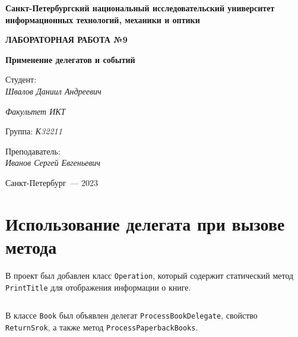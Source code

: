 \documentclass[a4paper,14pt]{extarticle}
\numberwithin{figure}{section}
\begin{document}
\begin{titlepage}
    \vspace{0pt plus2fill}
    \noindent

    \vspace{0pt plus6fill}
    \begin{center}
        \textbf{\large{Санкт-Петербургский национальный исследовательский университет информационных
                технологий, механики и оптики}}

        \vspace{0pt plus2fill}
        \textbf{\Large{ЛАБОРАТОРНАЯ РАБОТА №9}}

        \vspace{0pt plus2fill}
        \textbf{\large{Применение делегатов и событий}}
    \end{center}

    \vspace{0pt plus8fill}
    \begin{flushright}
        Студент: \\
        \textit{Швалов Даниил Андреевич}

        \textit{Факультет ИКТ}

        Группа: \textit{К32211}

        Преподаватель: \\
        \textit{Иванов Сергей Евгеньевич}
    \end{flushright}

    \vspace{0pt plus4fill}
    \begin{center}
        {Санкт-Петербург~--- 2023}
    \end{center}
\end{titlepage}

\section{Использование делегата при вызове метода}

В проект был добавлен класс \texttt{Operation}, который содержит статический метод \texttt{PrintTitle} для отображения информации о книге.

\inputminted{csharp}{../MyClass/MyClass/Operation.cs}

В классе \texttt{Book} был объявлен делегат \texttt{ProcessBookDelegate}, свойство \texttt{ReturnSrok}, а также метод \texttt{ProcessPaperbackBooks}.

\inputminted{csharp}{../MyClass/MyClass/Book.cs}
\end{document}
